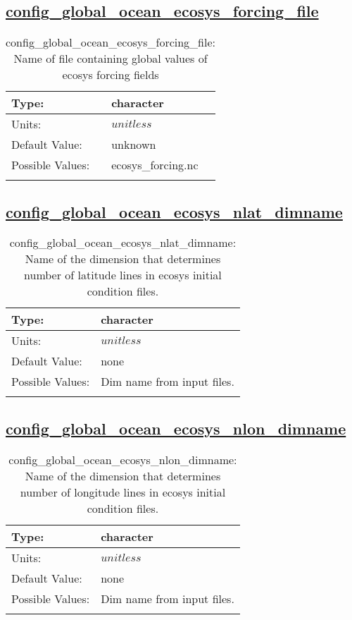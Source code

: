 \subsection[config\_global\_ocean\_ecosys\_forcing\_file]{\hyperref[sec:nm_tab_global_ocean]{config\_global\_ocean\_ecosys\_forcing\_file}}
\label{subsec:nm_sec_config_global_ocean_ecosys_forcing_file}
\begin{center}
\begin{longtable}{| p{2.0in} || p{4.0in} |}
    \hline
    Type: & character \\
    \hline
    Units: & $unitless$ \\
    \hline
    Default Value: & unknown \\
    \hline
    Possible Values: & ecosys\_forcing.nc \\
    \hline
    \caption{config\_global\_ocean\_ecosys\_forcing\_file: Name of file containing global values of ecosys forcing fields}
\end{longtable}
\end{center}
\subsection[config\_global\_ocean\_ecosys\_nlat\_dimname]{\hyperref[sec:nm_tab_global_ocean]{config\_global\_ocean\_ecosys\_nlat\_dimname}}
\label{subsec:nm_sec_config_global_ocean_ecosys_nlat_dimname}
\begin{center}
\begin{longtable}{| p{2.0in} || p{4.0in} |}
    \hline
    Type: & character \\
    \hline
    Units: & $unitless$ \\
    \hline
    Default Value: & none \\
    \hline
    Possible Values: & Dim name from input files. \\
    \hline
    \caption{config\_global\_ocean\_ecosys\_nlat\_dimname: Name of the dimension that determines number of latitude lines in ecosys initial condition files.}
\end{longtable}
\end{center}
\subsection[config\_global\_ocean\_ecosys\_nlon\_dimname]{\hyperref[sec:nm_tab_global_ocean]{config\_global\_ocean\_ecosys\_nlon\_dimname}}
\label{subsec:nm_sec_config_global_ocean_ecosys_nlon_dimname}
\begin{center}
\begin{longtable}{| p{2.0in} || p{4.0in} |}
    \hline
    Type: & character \\
    \hline
    Units: & $unitless$ \\
    \hline
    Default Value: & none \\
    \hline
    Possible Values: & Dim name from input files. \\
    \hline
    \caption{config\_global\_ocean\_ecosys\_nlon\_dimname: Name of the dimension that determines number of longitude lines in ecosys initial condition files.}
\end{longtable}
\end{center}
